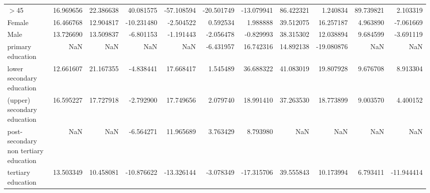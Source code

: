 \documentclass{article}
\begin{document}
\begin{table}[!htbp]
{\begin{tabular}{lrrrrrrrrrr}
$>$45                                   &  16.969656 &  22.386638 &  40.081575 & -57.108594 & -20.501749 & -13.079941 &  86.422321 &   1.240834 &  89.739821 &   2.103319 \\
Female                                &  16.466768 &  12.904817 & -10.231480 &  -2.504522 &   0.592534 &   1.988888 &  39.512075 &  16.257187 &   4.963890 &  -7.061669 \\
Male                                  &  13.726690 &  13.509837 &  -6.801153 &  -1.191443 &  -2.056478 &  -0.829993 &  38.315302 &  12.038894 &   9.684599 &  -3.691119 \\
primary education                     &        NaN &        NaN &        NaN &        NaN &  -6.431957 &  16.742316 &  14.892138 & -19.080876 &        NaN &        NaN \\
lower secondary education             &  12.661607 &  21.167355 &  -4.838441 &  17.668417 &   1.545489 &  36.688322 &  41.083019 &  19.807928 &   9.676708 &   8.913304 \\
(upper) secondary education           &  16.595227 &  17.727918 &  -2.792900 &  17.749656 &   2.079740 &  18.991410 &  37.263530 &  18.773899 &   9.003570 &   4.400152 \\
post-secondary non tertiary education &        NaN &        NaN &  -6.564271 &  11.965689 &   3.763429 &   8.793980 &        NaN &        NaN &        NaN &        NaN \\
tertiary education                    &  13.503349 &  10.458081 & -10.876622 & -13.326144 &  -3.078349 & -17.315706 &  39.555843 &  10.173994 &   6.793411 & -11.944414 \\
\bottomrule
\end{tabular}


}
\end{table}
\end{document}

